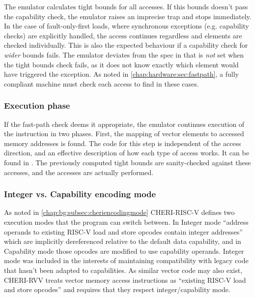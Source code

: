 The emulator calculates tight bounds for all accesses.
If this bounds doesn't pass the capability check, the emulator raises an imprecise trap and stops immediately.
In the case of fault-only-first loads, where synchronous exceptions (e.g. capability checks) are explicitly handled, the access continues regardless and elements are checked individually.
This is also the expected behaviour if a capability check for \emph{wider} bounds fails.
The emulator deviates from the spec in that  is \emph{not} set when the tight bounds check fails, as it does not know exactly which element would have triggered the exception.
As noted in \cref{chap:hardware:sec:fastpath}, a fully compliant machine must check each access to find  in these cases.

\subsubsection{Execution phase}\label{chap:hardware:subsec:execution}
If the fast-path check deems it appropriate, the emulator continues execution of the instruction in two phases.
First, the mapping of vector elements to accessed memory addresses is found.
The code for this step is independent of the access direction, and an effective description of how each type of access works.
It can be found in .
The previously computed tight bounds are sanity-checked against these accesses, and the accesses are actually performed.

\subsubsection{Integer vs. Capability encoding mode\label{chap:emu:rvv_int_mode}}
As noted in \cref{chap:bg:subsec:cheriencodingmode} CHERI-RISC-V defines two execution modes that the program can switch between.
In Integer mode \enquote{address operands to existing RISC-V load and store opcodes contain integer addresses} which are implicitly dereferenced relative to the default data capability, and in Capability mode those opcodes are modified to use capability operands.
Integer mode was included in the interests of maintaining compatibility with legacy code that hasn't been adapted to capabilities.
As similar vector code may also exist, CHERI-RVV treats vector memory access instructions as \enquote{existing RISC-V load and store opcodes} and requires that they respect integer/capability mode.